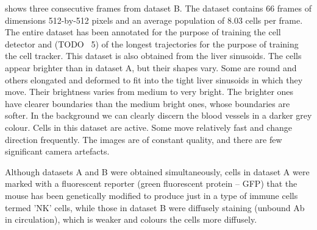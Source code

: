 	 shows three consecutive frames from dataset B. The dataset contains 66 frames of dimensions 512-by-512 pixels and an average population of 8.03 cells per frame. The entire dataset has been annotated for the purpose of training the cell detector and (TODO ~5) of the longest trajectories for the purpose of training the cell tracker. This dataset is also obtained from the liver sinusoids. The cells appear brighter than in dataset A, but their shapes vary. Some are round and others elongated and deformed to fit into the tight liver sinusoids in which they move. Their brightness varies from medium to very bright. The brighter ones have clearer boundaries than the medium bright ones, whose boundaries are softer. In the background we can clearly discern the blood vessels in a darker grey colour. Cells in this dataset are active. Some move relatively fast and change direction frequently. The images are of constant quality, and there are few significant camera artefacts.

	Although datasets A and B were obtained simultaneously, cells in dataset A were marked with a fluorescent reporter (green fluorescent protein -- GFP) that the mouse has been genetically modified to produce just in a type of immune cells termed 'NK' cells, while those in dataset B were diffusely staining (unbound Ab in circulation), which is weaker and colours the cells more diffusely.
	
